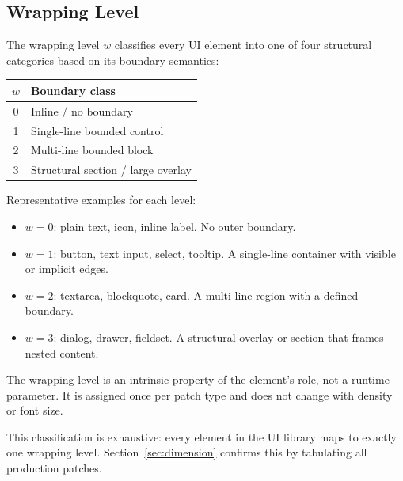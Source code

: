 \subsection{Wrapping Level}
\label{sec:wrapping}

The wrapping level $w$ classifies every UI element into one of four structural categories based on its boundary semantics:

\begin{center}
\begin{tabular}{cl}
\toprule
$w$ & Boundary class \\
\midrule
0 & Inline / no boundary \\
1 & Single-line bounded control \\
2 & Multi-line bounded block \\
3 & Structural section / large overlay \\
\bottomrule
\end{tabular}
\end{center}

\noindent Representative examples for each level:

\begin{itemize}
  \item $w = 0$: plain text, icon, inline label. No outer boundary.
  \item $w = 1$: button, text input, select, tooltip. A single-line container with visible or implicit edges.
  \item $w = 2$: textarea, blockquote, card. A multi-line region with a defined boundary.
  \item $w = 3$: dialog, drawer, fieldset. A structural overlay or section that frames nested content.
\end{itemize}

The wrapping level is an intrinsic property of the element's role, not a runtime parameter. It is assigned once per patch type and does not change with density or font size.

This classification is exhaustive: every element in the UI library maps to exactly one wrapping level. Section~\ref{sec:dimension} confirms this by tabulating all production patches.
